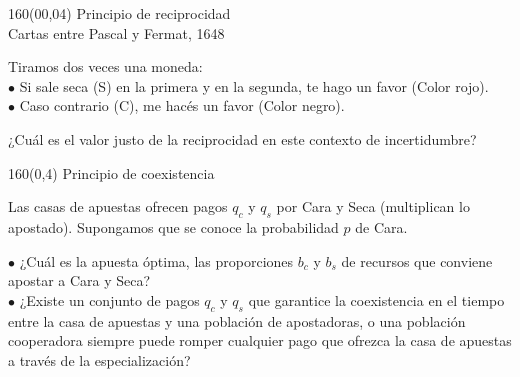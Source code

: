 \documentclass[shownotes,aspectratio=169]{beamer}
\begin{document}
\begin{frame}[plain]
\begin{textblock}{160}(00,04)
\centering
\LARGE Principio de reciprocidad \\
\large Cartas entre Pascal y Fermat, 1648
\end{textblock}
\vspace{1.5cm}



Tiramos dos veces una moneda: \\
$\bullet$ Si sale seca (S) en la primera y en la segunda, te hago un favor (Color rojo). \\
$\bullet$ Caso contrario (C), me hacés un favor (Color negro). \\
\begin{center}
\end{center}


\centering
¿Cuál es el valor justo de la reciprocidad en este contexto de incertidumbre?

\end{frame}


\begin{frame}[plain]
\begin{textblock}{160}(0,4)
 \centering \LARGE Principio de coexistencia
\end{textblock}
\vspace{1cm}

\normalsize

Las casas de apuestas ofrecen pagos $q_c$ y $q_s$ por Cara y Seca (multiplican lo apostado).
Supongamos que se conoce la probabilidad $p$ de Cara.

\vspace{0.3cm} \pause

$\bullet$ ¿Cuál es la apuesta óptima, las proporciones $b_c$ y $b_s$ de recursos que conviene apostar a Cara y Seca? \\ \pause
$\bullet$ ¿Existe un conjunto de pagos $q_c$ y $q_s$ que garantice la coexistencia en el tiempo entre la casa de apuestas y una población de apostadoras, o una población cooperadora siempre puede romper cualquier pago que ofrezca la casa de apuestas a través de la especialización?

\end{frame}
\end{document}
